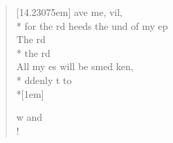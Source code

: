 \begin{flushleft}
\begin{verse}[14.23075em]
 ave me,    vil,\\*
for the rd heeds the und of my ep\\
 The rd    \\*
the rd    \\
 All my es will be smed   ken,\\*
ddenly t to \\*[1em]

w and   \\!
\end{verse}
\end{flushleft}
